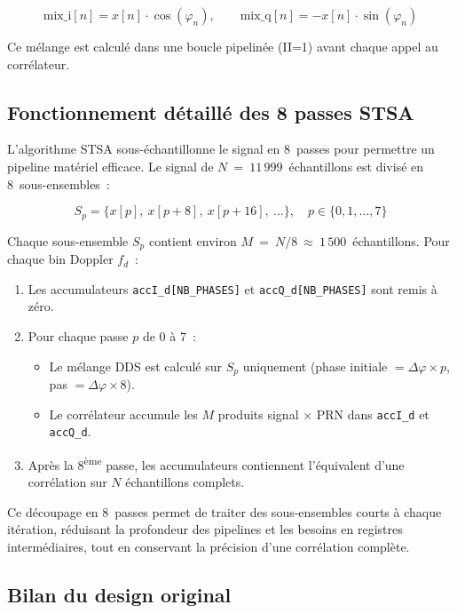 \documentclass[11pt,a4paper]{article}
\begin{document}
\begin{equation}
\text{mix\_i}[n] = x[n] \cdot \cos(\varphi_n), \qquad
\text{mix\_q}[n] = -x[n] \cdot \sin(\varphi_n)
\end{equation}

Ce mélange est calculé dans une boucle pipelinée (II=1) avant chaque appel au corrélateur.

\subsection{Fonctionnement détaillé des 8 passes STSA}

L'algorithme STSA sous-échantillonne le signal en 8~passes pour permettre un pipeline matériel efficace. Le signal de $N~=~11\,999$~échantillons est divisé en 8~sous-ensembles~:

\begin{equation}
S_p = \{x[p],\ x[p+8],\ x[p+16],\ \ldots\}, \quad p \in \{0, 1, \ldots, 7\}
\end{equation}

Chaque sous-ensemble $S_p$ contient environ $M~=~N/8~\approx~1\,500$~échantillons. Pour chaque bin Doppler $f_d$~:

\begin{enumerate}
  \item Les accumulateurs \texttt{accI\_d[NB\_PHASES]} et \texttt{accQ\_d[NB\_PHASES]} sont remis à zéro.
  \item Pour chaque passe $p$ de 0 à 7~:
    \begin{itemize}
      \item Le mélange DDS est calculé sur $S_p$ uniquement (phase initiale $= \Delta\varphi \times p$, pas $= \Delta\varphi \times 8$).
      \item Le corrélateur accumule les $M$ produits signal $\times$ PRN dans \texttt{accI\_d} et \texttt{accQ\_d}.
    \end{itemize}
  \item Après la 8\textsuperscript{ème} passe, les accumulateurs contiennent l'équivalent d'une corrélation sur $N$ échantillons complets.
\end{enumerate}

Ce découpage en 8~passes permet de traiter des sous-ensembles courts à chaque itération, réduisant la profondeur des pipelines et les besoins en registres intermédiaires, tout en conservant la précision d'une corrélation complète.

\subsection{Bilan du design original}
\end{document}
